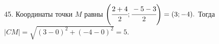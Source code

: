 45. Координаты точки $M$ равны $\left(\cfrac{2+4}{2};\cfrac{-5-3}{2}\right)=(3;-4).$ Тогда $|CM|=\sqrt{(3-0)^2+(-4-0)^2}=5.$\\

